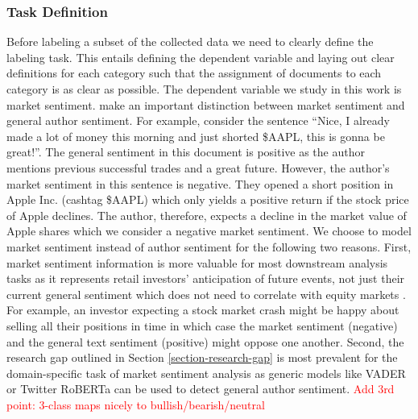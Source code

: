 \subsubsection{Task Definition}
Before labeling a subset of the collected data we need to clearly define the labeling task. This entails defining the dependent variable and laying out clear definitions for each category such that the assignment of documents to each category is as clear as possible. The dependent variable we study in this work is market sentiment.  make an important distinction between market sentiment and general author sentiment. For example, consider the sentence ``Nice, I already made a lot of money this morning and just shorted \$AAPL, this is gonna be great!''. The general sentiment in this document is positive as the author mentions previous successful trades and a great future. However, the author's market sentiment in this sentence is negative. They opened a short position in Apple Inc. (cashtag \$AAPL) which only yields a positive return if the stock price of Apple declines. The author, therefore, expects a decline in the market value of Apple shares which we consider a negative market sentiment. We choose to model market sentiment instead of author sentiment for the following two reasons. First, market sentiment information is more valuable for most downstream analysis tasks as it represents retail investors' anticipation of future events, not just their current general sentiment which does not need to correlate with equity markets \cite{chen2020finsome}. For example, an investor expecting a stock market crash might be happy about selling all their positions in time in which case the market sentiment (negative) and the general text sentiment (positive) might oppose one another.
 Second, the research gap outlined in Section \ref{section-research-gap} is most prevalent for the domain-specific task of market sentiment analysis as generic models like VADER \cite{hutto2014vader} or Twitter RoBERTa \cite{barbieri2020tweeteval} can be used to detect general author sentiment.
 \textcolor{red}{Add 3rd point: 3-class maps nicely to bullish/bearish/neutral}

